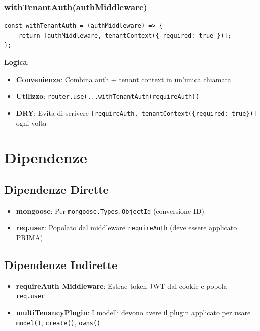 \documentclass[11pt,a4paper]{article}
\begin{document}
\subsubsection{withTenantAuth(authMiddleware)}

\begin{lstlisting}
const withTenantAuth = (authMiddleware) => {
    return [authMiddleware, tenantContext({ required: true })];
};
\end{lstlisting}

\textbf{Logica}:
\begin{itemize}
    \item \textbf{Convenienza}: Combina auth + tenant context in un'unica chiamata
    \item \textbf{Utilizzo}: \texttt{router.use(...withTenantAuth(requireAuth))}
    \item \textbf{DRY}: Evita di scrivere \texttt{[requireAuth, tenantContext(\{required: true\})]} ogni volta
\end{itemize}

\section{Dipendenze}

\subsection{Dipendenze Dirette}

\begin{itemize}
    \item \textbf{mongoose}: Per \texttt{mongoose.Types.ObjectId} (conversione ID)
    \item \textbf{req.user}: Popolato dal middleware \texttt{requireAuth} (deve essere applicato PRIMA)
\end{itemize}

\subsection{Dipendenze Indirette}

\begin{itemize}
    \item \textbf{requireAuth Middleware}: Estrae token JWT dal cookie e popola \texttt{req.user}
    \item \textbf{multiTenancyPlugin}: I modelli devono avere il plugin applicato per usare \texttt{model()}, \texttt{create()}, \texttt{owns()}
\end{itemize}
\end{document}
